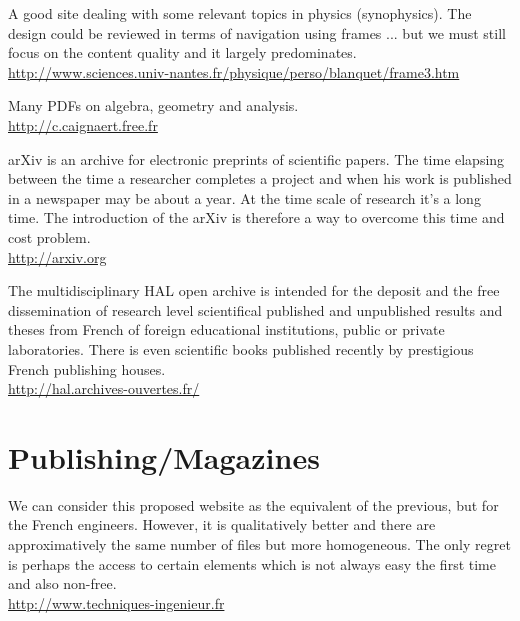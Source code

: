 	{\Large {}}{\Large {}}\bcdfrance{} A good site dealing with some relevant topics in physics (synophysics). The design could be reviewed in terms of navigation using frames ... but we must still focus on the content quality and it largely predominates.\\
	\href{http://www.sciences.univ-nantes.fr/physique/perso/blanquet/frame3.htm}{\color{blue} http://www.sciences.univ-nantes.fr/physique/perso/blanquet/frame3.htm}
	
	{\Large {}}{\Large {}}{\Large {}}\bcdfrance{} Many PDFs on algebra, geometry and analysis.\\
	\href{http://c.caignaert.free.fr}{\color{blue} http://c.caignaert.free.fr}
	
	{\Large {}}{\Large {}}{\Large {}} arXiv is an archive for electronic preprints of scientific papers. The time elapsing between the time a researcher completes a project and when his work is published in a newspaper may be about a year. At the time scale of research it's a long time. The introduction of the arXiv is therefore a way to overcome this time and cost problem.\\
	\href{http://arxiv.org}{\color{blue} http://arxiv.org}
	
	{\Large {}}{\Large {}}{\Large {}}\bcdfrance{} The multidisciplinary HAL open archive is intended for the deposit and the free dissemination of research level scientifical published and unpublished results and theses from French of foreign educational institutions, public or private laboratories. There is even scientific books published recently by prestigious French publishing houses.\\
	\href{http://hal.archives-ouvertes.fr/}{\color{blue} http://hal.archives-ouvertes.fr/}
	
	\pagebreak
	\section{Publishing/Magazines}

	{\Large {}}{\Large {}}{\Large {}}{\Large {}}{\Large {}}\bcdfrance{} We can consider this proposed website as the equivalent of the previous, but for the French engineers. However, it is qualitatively better and there are approximatively the same number of files but more homogeneous. The only regret is perhaps the access to certain elements which is not always easy the first time and also non-free.\\
	\href{http://www.techniques-ingenieur.fr}{\color{blue} http://www.techniques-ingenieur.fr}
	
